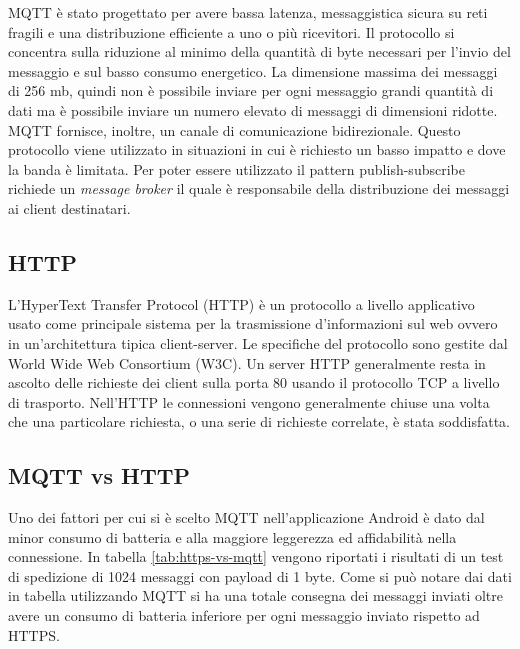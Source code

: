 MQTT è stato progettato per avere bassa latenza, messaggistica sicura su reti fragili e una  distribuzione efficiente a uno o più ricevitori. Il protocollo si concentra sulla riduzione al minimo della quantità di byte necessari per l’invio del messaggio e sul basso consumo energetico. La dimensione massima dei messaggi di 256 mb, quindi non è possibile inviare per ogni messaggio grandi quantità di dati ma è possibile inviare un numero elevato di messaggi di dimensioni ridotte. MQTT fornisce, inoltre, un canale di comunicazione bidirezionale. Questo protocollo viene utilizzato in situazioni in cui è richiesto un basso impatto e dove la banda è limitata. Per poter essere utilizzato il pattern publish-subscribe richiede un \emph{message broker} il quale è responsabile della distribuzione dei messaggi ai client destinatari.

\subsection{HTTP}
L'HyperText Transfer Protocol (HTTP) \cite{HTTP:site} è un protocollo a livello applicativo usato come principale sistema per la trasmissione d'informazioni sul web ovvero in un'architettura tipica client-server. Le specifiche del protocollo sono gestite dal World Wide Web Consortium (W3C). Un server HTTP generalmente resta in ascolto delle richieste dei client sulla porta 80 usando il protocollo TCP a livello di trasporto.
Nell'HTTP le connessioni vengono generalmente chiuse una volta che una particolare richiesta, o una serie di richieste correlate, è stata soddisfatta.

\subsection{MQTT vs HTTP}
Uno dei fattori per cui si è scelto MQTT nell’applicazione Android è dato dal minor consumo di batteria e alla maggiore leggerezza ed affidabilità nella connessione. In tabella \ref{tab:https-vs-mqtt} vengono riportati i risultati di un test \cite{nicholas:https-vs-mqtt} di spedizione di 1024 messaggi con payload di 1 byte. Come si può notare dai dati in tabella utilizzando MQTT si ha una totale consegna dei messaggi inviati oltre avere un consumo di batteria inferiore per ogni messaggio inviato rispetto ad HTTPS.

